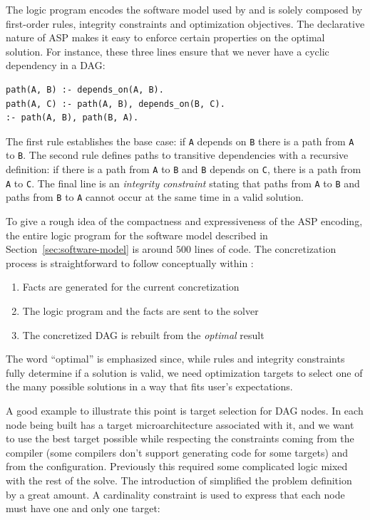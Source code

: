 The logic program encodes the software model used by \spack{}
and is solely composed by first-order rules, integrity
constraints and optimization objectives.
The declarative nature of ASP makes it easy to enforce
certain properties on the optimal solution. For instance,
these three lines ensure that we never have a cyclic dependency
in a DAG:

\begin{verbatim}
path(A, B) :- depends_on(A, B).
path(A, C) :- path(A, B), depends_on(B, C).
:- path(A, B), path(B, A).
\end{verbatim}

The first rule establishes the base case: if \texttt{A} depends
on \texttt{B} there is a path from \texttt{A} to \texttt{B}.
The second rule defines paths to transitive dependencies
with a recursive definition: if there is a path from \texttt{A}
to \texttt{B} and \texttt{B} depends on \texttt{C}, there is
a path from \texttt{A} to \texttt{C}. The final line is an
\emph{integrity constraint} stating that paths from \texttt{A}
to \texttt{B} and paths from \texttt{B} to \texttt{A} cannot
occur at the same time in a valid solution.

To give a rough idea of the compactness and expressiveness of
the ASP encoding, the entire logic program for the software
model described in Section~\ref{sec:software-model} is around
$500$ lines of code. The concretization process is straightforward
to follow conceptually within \spack:
\begin{enumerate}
\item Facts are generated for the current concretization \footnotemark
\item The logic program and the facts are sent to the solver
\item The concretized DAG is rebuilt from the \emph{optimal} result
\end{enumerate}
The word ``optimal'' is emphasized since, while rules and integrity
constraints fully determine if a solution is valid, we need
optimization targets to select one of the many possible solutions
in a way that fits user's expectations.

A good example to illustrate this point is target selection for DAG nodes.
In \spack{} each node being built has a target microarchitecture associated with it, and we want to use the best target possible while respecting the constraints coming from the compiler (some compilers don't support generating code for some targets) and from the configuration.
Previously this required some complicated logic mixed with the rest of the solve.
The introduction of \clingo{} simplified the problem definition by a great amount. A cardinality constraint is used to express that each node must have one and only one target:

